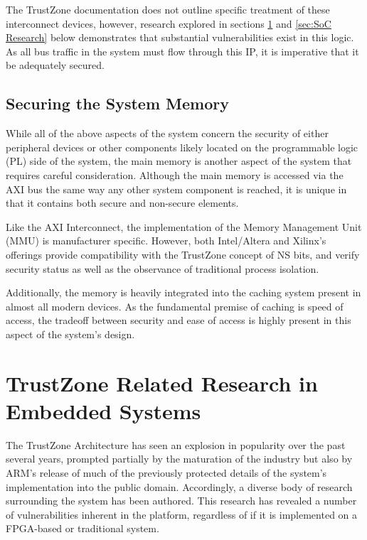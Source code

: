 \documentclass[journal]{IEEEtran}
\begin{document}
The TrustZone documentation does not outline specific treatment of these interconnect
devices, however, research explored in sections \ref{sec:TrustZone Research} and 
\ref{sec:SoC Research} below demonstrates that substantial vulnerabilities exist in this 
logic. As all bus traffic in the system must flow through this IP, it is imperative that 
it be adequately secured.

\subsection{Securing the System Memory} \label{sec:Securing Memory}
While all of the above aspects of the system concern the security of either peripheral
devices or other components likely located on the programmable logic (PL) side of the 
system, the main memory is another aspect of the system that requires careful 
consideration. Although the main memory is accessed via the AXI bus the same way any other
system component is reached, it is unique in that it contains both secure and non-secure
elements.

Like the AXI Interconnect, the implementation of the Memory Management Unit (MMU) is
manufacturer specific. However, both Intel/Altera and Xilinx's offerings provide
compatibility with the TrustZone concept of NS bits, and verify security status as well as
the observance of traditional process isolation. \cite{gross_breaking_2019}

Additionally, the memory is heavily integrated into the caching system present in almost
all modern devices. As the fundamental premise of caching is speed of access, the tradeoff
between security and ease of access is highly present in this aspect of the system's
design. 

\section{TrustZone Related Research in Embedded Systems} \label{sec:TrustZone Research}
The TrustZone Architecture has seen an explosion in popularity over the past several
years, prompted partially by the maturation of the industry but also by ARM's release of 
much of the previously protected details of the system's implementation into the public
domain. Accordingly, a diverse body of research surrounding the system has been authored.
This research has revealed a number of vulnerabilities inherent in the platform,
regardless of if it is implemented on a FPGA-based or traditional system.
\end{document}
